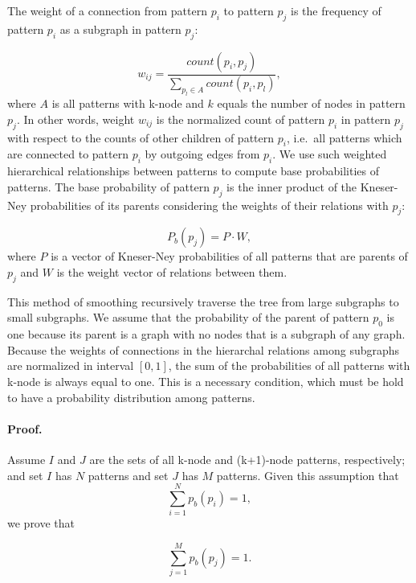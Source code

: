 The weight of a connection from pattern $p_i$ to pattern $p_j$ is the frequency of pattern $p_i$ as a subgraph in pattern $p_j$:

\begin{equation}
\label{eq:weights}
w_{ij} = \frac{count(p_i, p_j)}{\sum_{p_l \in A}count(p_i,p_l)},
\end{equation}
%
where $A$ is all patterns with k-node and $k$ equals the number of nodes in pattern $p_j$. 
In other words, weight $w_{ij}$ is the normalized count of pattern $p_i$ in pattern $p_j$ with respect to the counts of  other children of pattern  $p_i$, i.e.\ all patterns which are connected to pattern $p_i$ by outgoing edges from $p_i$.  
We use such weighted hierarchical relationships between patterns to compute base probabilities of patterns. 
The base probability of pattern $p_j$ is the inner product
of the \mbox{Kneser-Ney} probabilities of its parents considering the weights of their relations with $p_j$:

\begin{equation}
P_b(p_j)  = P \cdot W,
\end{equation}
%
where $P$ is a vector of \mbox{Kneser-Ney} probabilities of all patterns that are parents of $p_j$ and $W$ is the weight vector of relations between them. 

This method of smoothing recursively traverse the tree from large subgraphs to small subgraphs. 
We assume that the probability of the parent of pattern $p_0$ is one because its parent is a graph with no nodes that is a subgraph of any graph.
Because the weights of connections in the hierarchal relations among subgraphs are normalized in interval $[0,1]$, the
sum of the probabilities of all patterns with k-node is always
equal to one. 
This is a necessary condition, which must be hold to have a probability distribution among patterns.  

\paragraph{Proof.} 
Assume $I$ and $J$ are the sets of all k-node and (k+1)-node
patterns, respectively; and set $I$ has $N$ patterns and set $J$ has $M$ patterns. 
Given this assumption that 
\begin{equation}
\sum_{i=1}^N p_b(p_i)=1,
\end{equation}
%
we prove that  

\begin{equation}
  \label{eq:prob-level-j}
  \sum_{j=1}^M p_b(p_j)=1. 
\end{equation}

